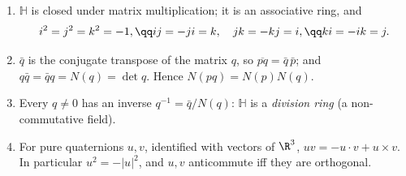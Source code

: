 \begin{proposition}\label{prop:quat}
\begin{enumerate}[label=(\alph*)]
\item $\mathbb H$ is closed under matrix multiplication; it is an associative ring, and
\[
\begin{gathered}i^2=j^2=k^2=-1,\qq ij=-ji=k,\quad jk=-kj=i,\qq ki=-ik=j.\end{gathered}
\]
\item $\bar q$ is the conjugate transpose of the matrix $q$, so $\overline{pq}=\bar q\,\bar p$; and $q\bar q=\bar qq=N(q)=\det q$. Hence $N(pq)=N(p)N(q)$.
\item Every $q\ne0$ has an inverse $q^{-1}=\bar q/N(q)$: $\mathbb H$ is a \emph{division ring} (a non-commutative field).
\item For pure quaternions $u,v$, identified with vectors of $\R^3$, $uv=-u\cdot v+u\times v$. In particular $u^2=-|u|^2$, and $u,v$ anticommute iff they are orthogonal.
\end{enumerate}
\end{proposition}
